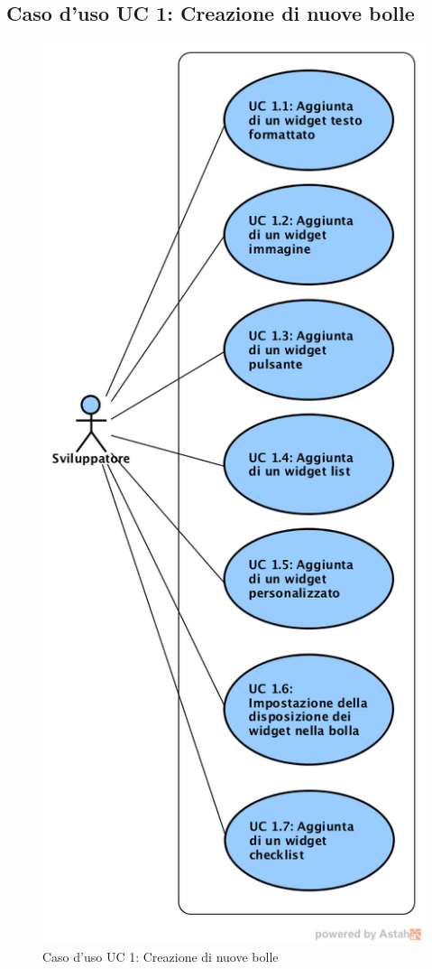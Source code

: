 \newpage
\subsection{Caso d'uso UC 1: Creazione di nuove bolle}
\label{Caso d'uso UC 1: Creazione di nuove bolle}
\begin{figure}[ht]
	\centering
	\includegraphics[scale=0.5]{Usecases/img/UC1.png}
	\caption{Caso d'uso UC 1: Creazione di nuove bolle}
\end{figure}


